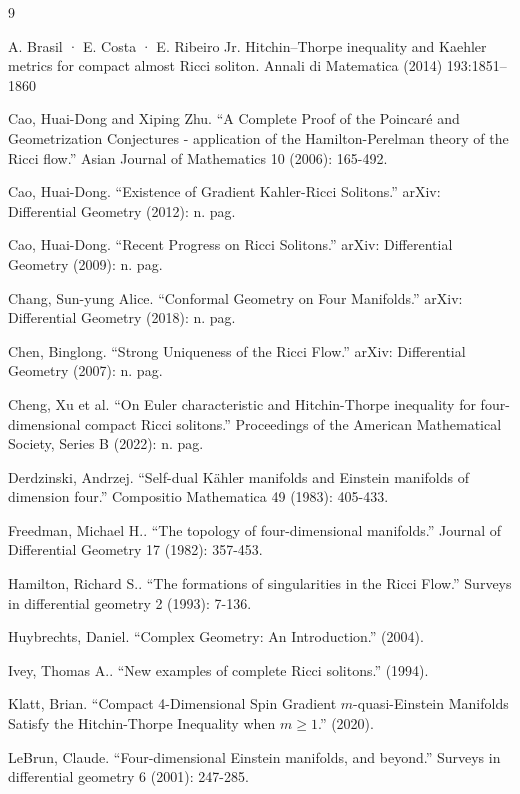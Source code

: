 \documentclass[openany, amssymb, psamsfonts]{amsart}
\theoremstyle{definition}
\numberwithin{equation}{section}
\begin{document}
\begin{thebibliography}{9}


 A. Brasil · E. Costa · E. Ribeiro Jr. Hitchin–Thorpe inequality and Kaehler metrics for compact almost Ricci soliton. Annali di Matematica (2014) 193:1851–1860 

Cao, Huai-Dong and Xiping Zhu. “A Complete Proof of the Poincaré and Geometrization Conjectures - application of the Hamilton-Perelman theory of the Ricci flow.” Asian Journal of Mathematics 10 (2006): 165-492.

Cao, Huai-Dong. “Existence of Gradient Kahler-Ricci Solitons.” arXiv: Differential Geometry (2012): n. pag.

Cao, Huai-Dong. “Recent Progress on Ricci Solitons.” arXiv: Differential Geometry (2009): n. pag.

Chang, Sun-yung Alice. “Conformal Geometry on Four Manifolds.” arXiv: Differential Geometry (2018): n. pag.

Chen, Binglong. “Strong Uniqueness of the Ricci Flow.” arXiv: Differential Geometry (2007): n. pag.

Cheng, Xu et al. “On Euler characteristic and Hitchin-Thorpe inequality for four-dimensional compact Ricci solitons.” Proceedings of the American Mathematical Society, Series B (2022): n. pag.

Derdzinski, Andrzej. “Self-dual Kähler manifolds and Einstein manifolds of dimension four.” Compositio Mathematica 49 (1983): 405-433.

Freedman, Michael H.. “The topology of four-dimensional manifolds.” Journal of Differential Geometry 17 (1982): 357-453.

Hamilton, Richard S.. “The formations of singularities in the Ricci Flow.” Surveys in differential geometry 2 (1993): 7-136.

Huybrechts, Daniel. “Complex Geometry: An Introduction.” (2004).

Ivey, Thomas A.. “New examples of complete Ricci solitons.” (1994).

Klatt, Brian. “Compact 4-Dimensional Spin Gradient $m$-quasi-Einstein Manifolds Satisfy the Hitchin-Thorpe Inequality when $m\ge 1$.” (2020).

LeBrun, Claude. “Four-dimensional Einstein manifolds, and beyond.” Surveys in differential geometry 6 (2001): 247-285.


\end{thebibliography}
\end{document}
